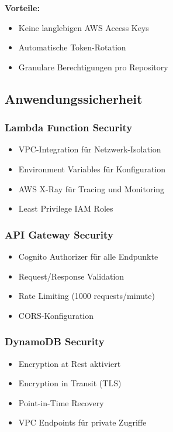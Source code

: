 \textbf{Vorteile:}
\begin{itemize}
    \item Keine langlebigen AWS Access Keys
    \item Automatische Token-Rotation
    \item Granulare Berechtigungen pro Repository
\end{itemize}

\subsection{Anwendungssicherheit}

\subsubsection{Lambda Function Security}
\begin{itemize}
    \item VPC-Integration für Netzwerk-Isolation
    \item Environment Variables für Konfiguration
    \item AWS X-Ray für Tracing und Monitoring
    \item Least Privilege IAM Roles
\end{itemize}

\subsubsection{API Gateway Security}
\begin{itemize}
    \item Cognito Authorizer für alle Endpunkte
    \item Request/Response Validation
    \item Rate Limiting (1000 requests/minute)
    \item CORS-Konfiguration
\end{itemize}

\subsubsection{DynamoDB Security}
\begin{itemize}
    \item Encryption at Rest aktiviert
    \item Encryption in Transit (TLS)
    \item Point-in-Time Recovery
    \item VPC Endpoints für private Zugriffe
\end{itemize}


